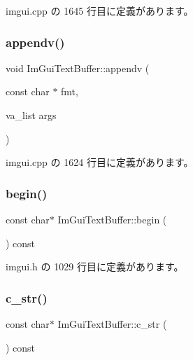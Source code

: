  imgui.\+cpp の 1645 行目に定義があります。

\mbox{\label{struct_im_gui_text_buffer_ad7c7e0d7ec1a12dd2a96a3dbb204deaf}} 
\subsubsection{\texorpdfstring{appendv()}{appendv()}}
{\footnotesize\ttfamily void Im\+Gui\+Text\+Buffer\+::appendv (\begin{DoxyParamCaption}\item[{const char $\ast$}]{fmt,  }\item[{va\+\_\+list}]{args }\end{DoxyParamCaption})}



 imgui.\+cpp の 1624 行目に定義があります。

\mbox{\label{struct_im_gui_text_buffer_aab6d83c6b9a8061287a4cb6135c1cab4}} 
\subsubsection{\texorpdfstring{begin()}{begin()}}
{\footnotesize\ttfamily const char$\ast$ Im\+Gui\+Text\+Buffer\+::begin (\begin{DoxyParamCaption}{ }\end{DoxyParamCaption}) const\hspace{0.3cm}{\ttfamily [inline]}}



 imgui.\+h の 1029 行目に定義があります。

\mbox{\label{struct_im_gui_text_buffer_afb03439bc91723e274bfb9d247a691b9}} 
\subsubsection{\texorpdfstring{c\+\_\+str()}{c\_str()}}
{\footnotesize\ttfamily const char$\ast$ Im\+Gui\+Text\+Buffer\+::c\+\_\+str (\begin{DoxyParamCaption}{ }\end{DoxyParamCaption}) const\hspace{0.3cm}{\ttfamily [inline]}}



